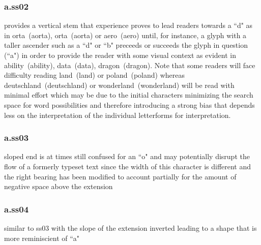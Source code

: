 \subsubsection{{\sstwo a}.ss02}
provides a vertical stem that experience proves
to lead readers towards a ``d" as in
\mbox{{orta} (aorta)},
\mbox{{ort{\sstwo a}} (aorta)} or
\mbox{{\sstwo aero} (aero)}
until, for instance, a glyph with a taller ascender such as a ``d" or ``b"
preceeds or succeeds the glyph in question (``a") in order to provide
the reader with some visual context as evident in
\mbox{{\sstwo ability} (ability)},
\mbox{{\sstwo data} (data)},
\mbox{{\sstwo dragon} (dragon)}. Note that some readers will face
difficulty reading \mbox{{\sstwo land} (land)} or
\mbox{{\sstwo poland} (poland)} whereas \mbox{{\sstwo deutschland} (deutschland)} or
\mbox{{\sstwo wonderland} (wonderland)}
will be read with minimal effort which may be due to the initial
characters minimizing the search space for word possibilities and therefore
introducing a strong bias that depends less on the interpretation of the
individual letterforms for interpretation.

\subsubsection{{\ssthree a}.ss03}
sloped end is at times still confused for an
``o" and may potentially disrupt the flow of a formerly typeset text since
the width of this character is different and the right bearing has been
modified to account partially for the amount of negative space above the
extension

\subsubsection{{\ssfour a}.ss04}
similar to ss03 with the slope of the extension
inverted leading to a shape that is more reminiscient of ``a"
